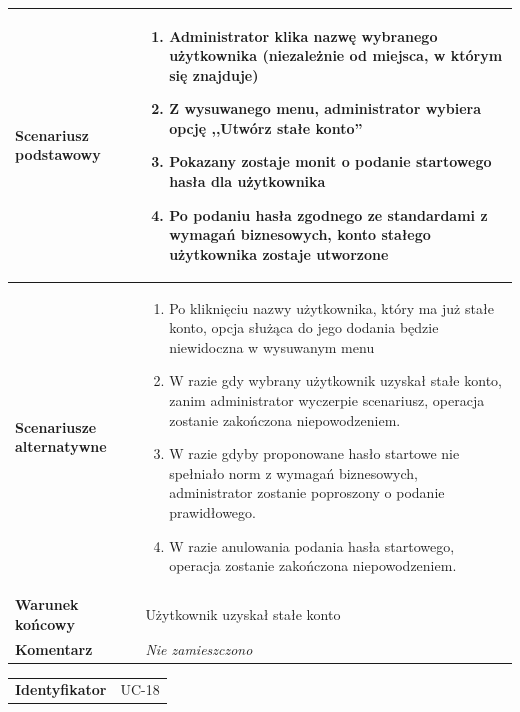\documentclass[11pt,oneside,a4paper,titlepage,onecolumn]{article}
\newenvironment{enumreq}
{ \begin{enumerate}[topsep=0pt,itemsep=-1ex,partopsep=1ex,parsep=1ex] }
{ \end{enumerate}                  }
\begin{document}
{\begin{tabular}{ | l | l | }
	\hline
		\parbox[t]{4cm}{\textbf{Scenariusz podstawowy}} & \parbox[t]{11cm}{
			\begin{enumreq}
				\item Administrator klika nazwę wybranego użytkownika
				(niezależnie od miejsca, w którym się znajduje)
				\item Z wysuwanego menu, administrator wybiera opcję
				,,Utwórz stałe konto''
				\item Pokazany zostaje monit o podanie startowego hasła
				dla użytkownika
				\item Po podaniu hasła zgodnego ze standardami z wymagań
				biznesowych, konto stałego użytkownika zostaje utworzone
			\end{enumreq}
		}
		\\
		
	\hline
		\parbox[t]{4cm}{\textbf{Scenariusze alternatywne}} & \parbox[t]
		{11cm}{
			\begin{enumreq}
				\item Po kliknięciu nazwy użytkownika, który ma już stałe
				konto, opcja służąca do jego dodania będzie niewidoczna
				w wysuwanym menu
				\item W razie gdy wybrany użytkownik uzyskał stałe konto,
				zanim administrator wyczerpie scenariusz, operacja zostanie
				zakończona niepowodzeniem.
				\item W razie gdyby proponowane hasło startowe nie spełniało
				norm z wymagań biznesowych, administrator zostanie poproszony
				o podanie prawidłowego.
				\item W razie anulowania podania hasła startowego, operacja
				zostanie zakończona niepowodzeniem.
			\end{enumreq}
		}
		\\
		
	\hline
		\parbox[t]{4cm}{\textbf{Warunek końcowy}} & \parbox[t]{11cm}{
			Użytkownik uzyskał stałe konto
		}
		\\
		
	\hline
		\parbox[t]{4cm}{\textbf{Komentarz}} & \parbox[t]{11cm}{
			\textit{Nie zamieszczono}
		}
		\\

	\hline
\end{tabular}

\vspace{2em}

\begin{tabular}{ | l | l | }
	\hline
		\textbf{Identyfikator} & 
		UC-18
		\\
		

\end{tabular}}
\end{document}
